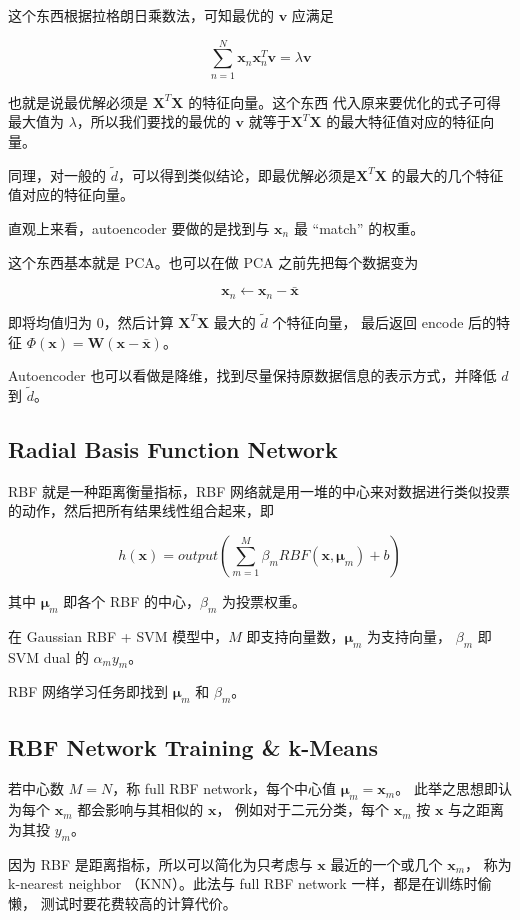 \documentclass[a4paper]{article}
\begin{document}
这个东西根据拉格朗日乘数法，可知最优的 $\mathbf{v}$ 应满足

$$\sum_{n=1}^{N}\mathbf{x}_n\mathbf{x}_n^T\mathbf{v}=\lambda \mathbf{v}$$

也就是说最优解必须是 $\mathbf{X}^T\mathbf{X}$ 的特征向量。这个东西
代入原来要优化的式子可得最大值为 $\lambda$，所以我们要找的最优的 $\mathbf{v}$
就等于$\mathbf{X}^T\mathbf{X}$ 的最大特征值对应的特征向量。

同理，对一般的 $\tilde{d}$，可以得到类似结论，即最优解必须是$\mathbf{X}^T\mathbf{X}$ 的最大的几个特征值对应的特征向量。

直观上来看，autoencoder 要做的是找到与 $\mathbf{x}_n$ 最 “match” 的权重。

这个东西基本就是 PCA。也可以在做 PCA 之前先把每个数据变为

$$\mathbf{x}_n \leftarrow \mathbf{x}_n - \bar{\mathbf{x}}$$

即将均值归为 0，然后计算 $\mathbf{X}^T\mathbf{X}$ 最大的 $\tilde{d}$ 个特征向量，
最后返回 encode 后的特征 $\Phi(\mathbf{x}) = \mathbf{W}(\mathbf{x} - \bar{\mathbf{x}})$。

Autoencoder 也可以看做是降维，找到尽量保持原数据信息的表示方式，并降低 $d$ 到 $\tilde{d}$。

\subsection{Radial Basis Function Network}
RBF 就是一种距离衡量指标，RBF 网络就是用一堆的中心来对数据进行类似投票
的动作，然后把所有结果线性组合起来，即

$$h(\mathbf{x}) = output \left ( \sum_{m=1}^{M}\beta_m RBF(\mathbf{x},\bm{\mu}_m)+b \right )$$

其中 $\bm{\mu}_m$ 即各个 RBF 的中心，$\beta_m$ 为投票权重。

在 Gaussian RBF + SVM 模型中，$M$ 即支持向量数，$\bm{\mu}_m$ 为支持向量，
$\beta_m$ 即 SVM dual 的 $\alpha_m y_m$。

RBF 网络学习任务即找到 $\bm{\mu}_m$ 和 $\beta_m$。

\subsection{RBF Network Training \& k-Means}
若中心数 $M = N$，称 full RBF network，每个中心值 $\bm{\mu}_m = \mathbf{x}_m$。
此举之思想即认为每个 $\mathbf{x}_m$ 都会影响与其相似的 $\mathbf{x}$，
例如对于二元分类，每个 $\mathbf{x}_m$ 按 $\mathbf{x}$ 与之距离为其投 $y_m$。

因为 RBF 是距离指标，所以可以简化为只考虑与 $\mathbf{x}$ 最近的一个或几个 $\mathbf{x}_m$，
称为 k-nearest neighbor （KNN）。此法与 full RBF network 一样，都是在训练时偷懒，
测试时要花费较高的计算代价。
\end{document}
